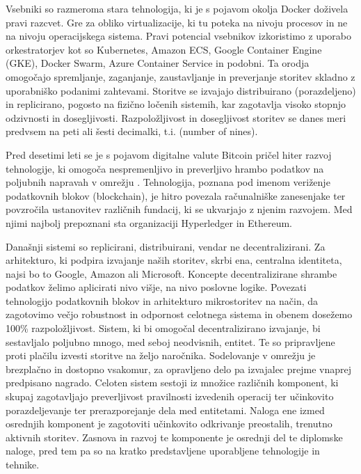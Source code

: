 \documentclass[a4paper, 12pt]{book}
\begin{document}
Vsebniki so razmeroma stara tehnologija, ki je s pojavom okolja Docker doživela pravi razcvet.
Gre za  obliko virtualizacije, ki tu poteka na nivoju procesov in ne na nivoju operacijskega sistema.
Pravi potencial vsebnikov izkoristimo z uporabo orkestratorjev kot so Kubernetes, Amazon ECS, Google Container Engine (GKE), Docker Swarm, Azure Container Service in podobni.
Ta orodja omogočajo spremljanje, zaganjanje, zaustavljanje in preverjanje storitev skladno z uporabniško podanimi zahtevami.
Storitve se izvajajo distribuirano (porazdeljeno) in replicirano, pogosto na fizično ločenih sistemih, kar zagotavlja visoko stopnjo odzivnosti in dosegljivosti. Razpoložljivost in dosegljivost storitev se danes meri predvsem na peti ali šesti decimalki, t.i.  (number of nines).

Pred desetimi leti se je s pojavom digitalne valute Bitcoin pričel hiter razvoj tehnologije, ki omogoča nespremenljivo in preverljivo hrambo podatkov na poljubnih napravah v omrežju \cite{nakamoto2008bitcoin}.
Tehnologija, poznana pod imenom veriženje podatkovnih blokov (blockchain), je hitro povezala računalniške zanesenjake ter povzročila ustanovitev različnih fundacij, ki se ukvarjajo z njenim razvojem.
Med njimi najbolj prepoznani sta organizaciji Hyperledger in Ethereum.

Današnji sistemi so replicirani, distribuirani, vendar ne decentralizirani.
Za arhitekturo, ki podpira izvajanje naših storitev, skrbi ena, centralna identiteta, najsi bo to Google, Amazon ali Microsoft.
Koncepte decentralizirane shrambe podatkov želimo aplicirati nivo višje, na nivo poslovne logike.
Povezati tehnologijo podatkovnih blokov in arhitekturo mikrostoritev na način, da zagotovimo večjo robustnost in odpornost celotnega sistema in obenem dosežemo 100\% razpoložljivost.
Sistem, ki bi omogočal decentralizirano izvajanje, bi sestavljalo poljubno mnogo, med seboj neodvisnih, entitet.
Te so pripravljene proti plačilu izvesti storitve na željo naročnika.
Sodelovanje v omrežju je brezplačno in dostopno vsakomur, za opravljeno delo pa izvajalec prejme vnaprej predpisano nagrado.
Celoten sistem sestoji iz množice različnih komponent, ki skupaj zagotavljajo preverljivost pravilnosti izvedenih operacij ter učinkovito porazdeljevanje ter prerazporejanje dela med entitetami.
Naloga ene izmed osrednjih komponent je zagotoviti učinkovito odkrivanje preostalih, trenutno aktivnih storitev.
Zasnova in razvoj te komponente je osrednji del te diplomske naloge, pred tem pa so na kratko predstavljene uporabljene tehnologije in tehnike.
\end{document}
